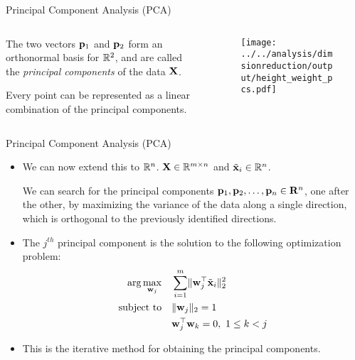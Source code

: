 \documentclass[aspectratio=169]{beamer}
\let\olditem\item
\renewcommand{\item}{\setlength{\itemsep}{\fill}\olditem}
\def\mf{\ensuremath\mathbf}
\def\mb{\ensuremath\mathbb}
\begin{document}
\begin{frame}[t]{Principal Component Analysis (PCA)}
  \begin{columns}
    \begin{column}{0.55\textwidth}
      The two vectors $\mf{p}_1$ and $\mf{p}_2$ form an orthonormal basis for $\mb{R}^2$, and are called the \textit{principal components} of the data $\mf{X}$.
      \vspace{0.2cm}
      
      Every point can be represented as a linear combination of the principal components.
    \end{column}
    \begin{column}{0.425\textwidth}
      \begin{figure}
        \centering
        \texttt{[image: ../../analysis/dimsionreduction/output/height\_weight\_pcs.pdf]}
      \end{figure}
    \end{column}
  \end{columns}
\end{frame}


\begin{frame}[t]{Principal Component Analysis (PCA)}
\begin{itemize}
  \item We can now extend this to $\mb{R}^n$. $\mf{X} \in \mb{R}^{m \times n}$ and $\tilde{\mf{x}}_i \in \mb{R}^n$.
  
  We can search for the principal components $\mf{p}_1, \mf{p}_2, \ldots, \mf{p}_n \in \mf{R}^n$, one after the other, by maximizing the variance of the data along a single direction, which is orthogonal to the previously identified directions.

  \item The $j^{th}$ principal component is the solution to the following optimization problem:
  \begin{align*}
    \arg\underset{\mf{w}_j}{\max} \quad & \sum_{i=1}^m \lVert \mf{w}_j^\top\tilde{\mf{x}}_i \rVert_2^2 \\
      \text{subject to} \quad & \lVert \mf{w}_j \rVert_2 = 1 \\
      & \mf{w}_j^\top\mf{w}_k = 0, \,\, 1 \leq k < j
  \end{align*}
  
  \item This is the iterative method for obtaining the principal components.
\end{itemize}
\end{frame}
\end{document}
